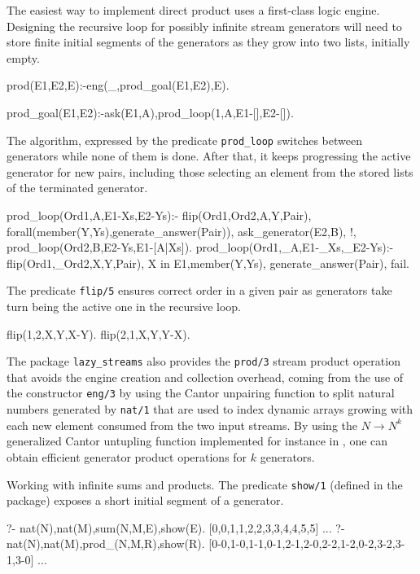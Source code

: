\documentclass{new_tlp}
\begin{document}
The easiest way to implement direct product uses a first-class logic engine.
Designing the recursive loop for possibly infinite stream generators
will need to store finite initial 
segments of the generators as they grow into two lists, initially
empty.
\begin{code}
prod(E1,E2,E):-eng(_,prod_goal(E1,E2),E).

prod_goal(E1,E2):-ask(E1,A),prod_loop(1,A,E1-[],E2-[]).
\end{code}

The algorithm, expressed by the predicate {\tt prod\_loop}
switches between generators while none of them is done.
After that, it keeps progressing the active generator 
for new pairs, including those selecting an element 
from the stored lists of the terminated generator.
\begin{code}
prod_loop(Ord1,A,E1-Xs,E2-Ys):-
  flip(Ord1,Ord2,A,Y,Pair),
  forall(member(Y,Ys),generate_answer(Pair)),
  ask_generator(E2,B),
  !,
  prod_loop(Ord2,B,E2-Ys,E1-[A|Xs]).
prod_loop(Ord1,_A,E1-_Xs,_E2-Ys):-
  flip(Ord1,_Ord2,X,Y,Pair),
  X in E1,member(Y,Ys),
  generate_answer(Pair),
  fail.
\end{code}

The predicate {\tt flip/5} ensures correct order in a given pair
as  generators take turn being the active one in the recursive loop. 
\begin{code} 
flip(1,2,X,Y,X-Y).
flip(2,1,X,Y,Y-X).
\end{code}

The package {\tt lazy\_streams} also provides the {\tt prod/3} stream product 
operation that avoids the engine creation and collection overhead,
coming from the use of the constructor {\tt eng/3} by using the Cantor
unpairing function  to split natural numbers generated by {\tt nat/1}
that are used to index dynamic arrays growing with each new element consumed
from the two input streams. By using the  $N \rightarrow N^k$ generalized Cantor
 untupling function implemented for instance in \cite{serpro}, one can obtain efficient
 generator  product operations for $k$ generators.


\BX
Working with infinite sums and products. The  predicate {\tt show/1} (defined in the package) exposes a short initial segment of a generator.
\begin{codex}
?- nat(N),nat(M),sum(N,M,E),show(E).
[0,0,1,1,2,2,3,3,4,4,5,5]
...
?- nat(N),nat(M),prod_(N,M,R),show(R).
[0-0,1-0,1-1,0-1,2-1,2-0,2-2,1-2,0-2,3-2,3-1,3-0]
...
\end{codex}
\EX
\end{document}
